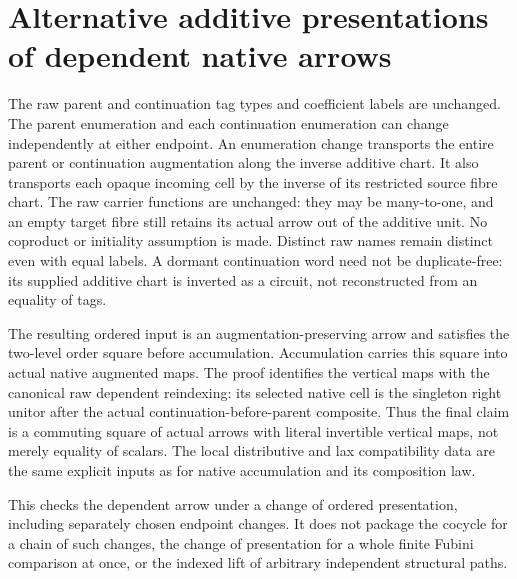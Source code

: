 \documentclass{article}
\begin{document}
\section*{Alternative additive presentations of dependent native arrows}
The raw parent and continuation tag types and coefficient labels
are unchanged. The parent enumeration and each continuation
enumeration can change independently at either endpoint. An
enumeration change transports the entire parent or continuation
augmentation along the inverse additive chart. It also transports
each opaque incoming cell by the inverse of its restricted source
fibre chart. The raw carrier functions are unchanged: they may be
many-to-one, and an empty target fibre still retains its actual
arrow out of the additive unit. No coproduct or initiality assumption
is made. Distinct raw names remain distinct even with equal labels.
A dormant continuation word need not be duplicate-free: its
supplied additive chart is inverted as a circuit, not reconstructed
from an equality of tags.

The resulting ordered input is an augmentation-preserving arrow
and satisfies the two-level order square before accumulation.
Accumulation carries this square into actual native augmented maps.
The proof identifies the vertical maps with the canonical raw
dependent reindexing: its selected native cell is the singleton
right unitor after the actual continuation-before-parent composite.
Thus the final claim is a commuting square of actual arrows with
literal invertible vertical maps, not merely equality of scalars.
The local distributive and lax compatibility data are the same
explicit inputs as for native accumulation and its composition law.

This checks the dependent arrow under a change of ordered
presentation, including separately chosen endpoint changes. It
does not package the cocycle for a chain of such changes, the change
of presentation for a whole finite Fubini comparison at once, or
the indexed lift of arbitrary independent structural paths.
\end{document}
